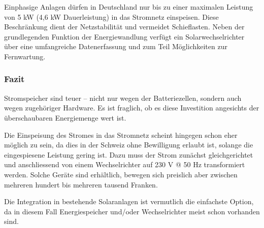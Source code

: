 \fi

Einphasige Anlagen dürfen in Deutschland nur bis zu einer maximalen Leistung von 5 \si{kW} (4,6 \si{kW} Dauerleistung) in das Stromnetz einspeisen. Diese Beschränkung dient der Netzstabilität und vermeidet Schieflasten. Neben der grundlegenden Funktion der Energiewandlung verfügt ein Solarwechselrichter über eine umfangreiche Datenerfassung und zum Teil Möglichkeiten zur Fernwartung. \cite{solar-wr-wiki}

\subsubsection{Fazit}
Stromspeicher sind teuer – nicht nur wegen der Batteriezellen, sondern auch wegen zugehöriger Hardware. Es ist fraglich, ob es diese Investition angesichts der überschaubaren Energiemenge wert ist. 

Die Einspeisung des Stromes in das Stromnetz scheint hingegen schon eher möglich zu sein, da dies in der Schweiz ohne Bewilligung erlaubt ist, solange die eingespiesene Leistung gering ist. Dazu muss der Strom zunächst gleichgerichtet und anschliessend von einem Wechselrichter auf 230 \si{V} @ 50 \si{Hz} transformiert werden. Solche Geräte sind erhältlich, bewegen sich preislich aber zwischen mehreren hundert bis mehreren tausend Franken.

Die Integration in bestehende Solaranlagen ist vermutlich die einfachste Option, da in diesem Fall Energiespeicher und/oder Wechselrichter meist schon vorhanden sind.


\clearpage 